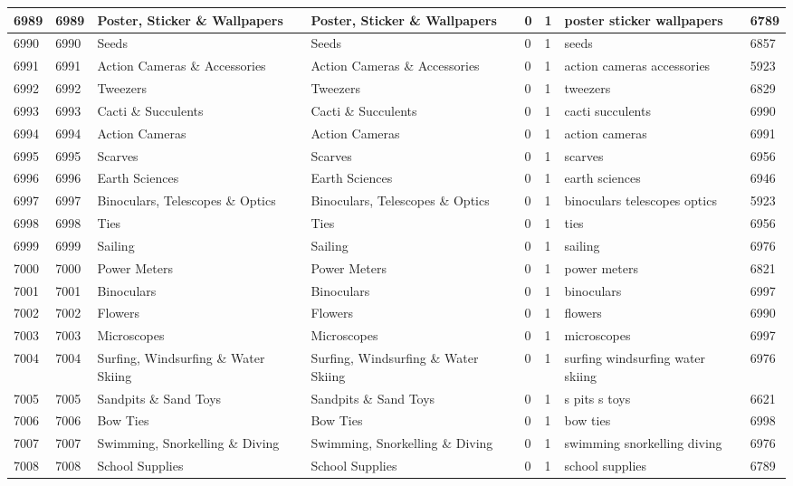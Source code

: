 \begin{longtable}{|l|l|l|l|l|l|l|l|}
6989 & 6989 & Poster, Sticker \& Wallpapers & Poster, Sticker \& Wallpapers & 0 & 1 & poster sticker wallpapers & 6789 \\ \hline 
6990 & 6990 & Seeds & Seeds & 0 & 1 & seeds & 6857 \\ \hline 
6991 & 6991 & Action Cameras \& Accessories & Action Cameras \& Accessories & 0 & 1 & action cameras accessories & 5923 \\ \hline 
6992 & 6992 & Tweezers & Tweezers & 0 & 1 & tweezers & 6829 \\ \hline 
6993 & 6993 & Cacti \& Succulents & Cacti \& Succulents & 0 & 1 & cacti succulents & 6990 \\ \hline 
6994 & 6994 & Action Cameras & Action Cameras & 0 & 1 & action cameras & 6991 \\ \hline 
6995 & 6995 & Scarves & Scarves & 0 & 1 & scarves & 6956 \\ \hline 
6996 & 6996 & Earth Sciences & Earth Sciences & 0 & 1 & earth sciences & 6946 \\ \hline 
6997 & 6997 & Binoculars, Telescopes \& Optics & Binoculars, Telescopes \& Optics & 0 & 1 & binoculars telescopes optics & 5923 \\ \hline 
6998 & 6998 & Ties & Ties & 0 & 1 & ties & 6956 \\ \hline 
6999 & 6999 & Sailing & Sailing & 0 & 1 & sailing & 6976 \\ \hline 
7000 & 7000 & Power Meters & Power Meters & 0 & 1 & power meters & 6821 \\ \hline 
7001 & 7001 & Binoculars & Binoculars & 0 & 1 & binoculars & 6997 \\ \hline 
7002 & 7002 & Flowers & Flowers & 0 & 1 & flowers & 6990 \\ \hline 
7003 & 7003 & Microscopes & Microscopes & 0 & 1 & microscopes & 6997 \\ \hline 
7004 & 7004 & Surfing, Windsurfing \& Water Skiing & Surfing, Windsurfing \& Water Skiing & 0 & 1 & surfing windsurfing water skiing & 6976 \\ \hline 
7005 & 7005 & Sandpits \& Sand Toys & Sandpits \& Sand Toys & 0 & 1 & s pits s toys & 6621 \\ \hline 
7006 & 7006 & Bow Ties & Bow Ties & 0 & 1 & bow ties & 6998 \\ \hline 
7007 & 7007 & Swimming, Snorkelling \& Diving & Swimming, Snorkelling \& Diving & 0 & 1 & swimming snorkelling diving & 6976 \\ \hline 
7008 & 7008 & School Supplies & School Supplies & 0 & 1 & school supplies & 6789 \\ \hline 

\end{longtable}
